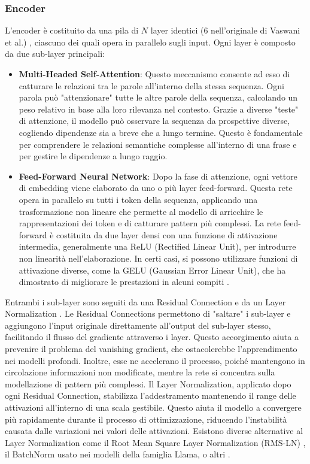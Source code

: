 \subsubsection{Encoder}
L'encoder è costituito da una pila di \(N\) layer identici (6 nell'originale di Vaswani et al.) \cite{vaswani2023attentionneed}, ciascuno dei quali opera in parallelo sugli input. Ogni layer è composto da due sub-layer principali:
\begin{itemize}
	\item \textbf{Multi-Headed Self-Attention}: Questo meccanismo consente ad esso di catturare le relazioni tra le parole all'interno della stessa sequenza. Ogni parola può "attenzionare" tutte le altre parole della sequenza, calcolando un peso relativo in base alla loro rilevanza nel contesto. Grazie a diverse "teste" di attenzione, il modello può osservare la sequenza da prospettive diverse, cogliendo dipendenze sia a breve che a lungo termine. Questo è fondamentale per comprendere le relazioni semantiche complesse all'interno di una frase e per gestire le dipendenze a lungo raggio.
	\item \textbf{Feed-Forward Neural Network}: Dopo la fase di attenzione, ogni vettore di embedding viene elaborato da uno o più layer feed-forward. Questa rete opera in parallelo su tutti i token della sequenza, applicando una trasformazione non lineare che permette al modello di arricchire le rappresentazioni dei token e di catturare pattern più complessi. La rete feed-forward è costituita da due layer densi con una funzione di attivazione intermedia, generalmente una ReLU (Rectified Linear Unit), per introdurre non linearità nell'elaborazione. In certi casi, si possono utilizzare funzioni di attivazione diverse, come la GELU (Gaussian Error Linear Unit), che ha dimostrato di migliorare le prestazioni in alcuni compiti \cite{hendrycks2023gaussianerrorlinearunits}.
\end{itemize}
Entrambi i sub-layer sono seguiti da una Residual Connection e da un Layer Normalization \cite{ba2016layernormalization}. Le Residual Connections permettono di "saltare" i sub-layer e aggiungono l'input originale direttamente all'output del sub-layer stesso, facilitando il flusso del gradiente attraverso i layer. Questo accorgimento aiuta a prevenire il problema del vanishing gradient, che ostacolerebbe l'apprendimento nei modelli profondi. Inoltre, esse ne accelerano il processo, poiché mantengono in circolazione informazioni non modificate, mentre la rete si concentra sulla modellazione di pattern più complessi.
Il Layer Normalization, applicato dopo ogni Residual Connection, stabilizza l'addestramento mantenendo il range delle attivazioni all'interno di una scala gestibile. Questo aiuta il modello a convergere più rapidamente durante il processo di ottimizzazione, riducendo l'instabilità causata dalle variazioni nei valori delle attivazioni. Esistono diverse alternative al Layer Normalization come il Root Mean Square Layer Normalization (RMS-LN) \cite{zhang2019rootmeansquarelayer}, il BatchNorm usato nei modelli della famiglia Llama, o altri \cite{https://doi.org/10.5281/zenodo.3525484}.

